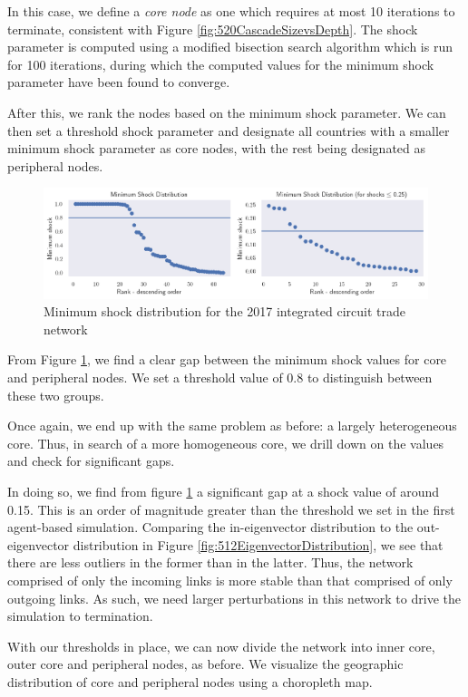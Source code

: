 \documentclass[12pt,letterpaper]{report}
\begin{document}
	In this case, we define a \textit{core node} as one which requires at most 10 iterations to terminate, consistent with Figure \ref{fig:520CascadeSizevsDepth}. The shock parameter is computed using a modified bisection search algorithm which is run for 100 iterations, during which the computed values for the minimum shock parameter have been found to converge.
	
	After this, we rank the nodes based on the minimum shock parameter. We can then set a threshold shock parameter and designate all countries with a smaller minimum shock parameter as core nodes, with the rest being designated as peripheral nodes. 
	
	\begin{figure}[!h]
		\centering
		\includegraphics[width=\textwidth]{Fig522-MinimumShock.png}
		\caption{Minimum shock  distribution for the 2017 integrated circuit trade network }\label{fig:522MinimumShock}
	\end{figure}
	
	From Figure \ref{fig:522MinimumShock}, we find a clear gap between the minimum shock values for core and peripheral nodes. We set a threshold value of 0.8 to distinguish between these two groups.
	
	Once again, we end up with the same problem as before: a largely heterogeneous core. Thus, in search of a more homogeneous core, we drill down on the values and check for significant gaps.
	
	In doing so, we find from figure \ref{fig:522MinimumShock} a significant gap at a shock value of around 0.15. This is an order of magnitude greater than the threshold we set in the first agent-based simulation. Comparing the in-eigenvector distribution to the out-eigenvector distribution in Figure \ref{fig:512EigenvectorDistribution}, we see that there are less outliers in the former than in the latter. Thus, the network comprised of only the incoming links is more stable than that comprised of only outgoing links. As such, we need larger perturbations in this network to drive the simulation to termination.
	
	With our thresholds in place, we can 
	now divide the network into inner core, outer core and peripheral nodes, as before. We visualize the geographic distribution of core and peripheral nodes using a choropleth map.
	
\end{document}
